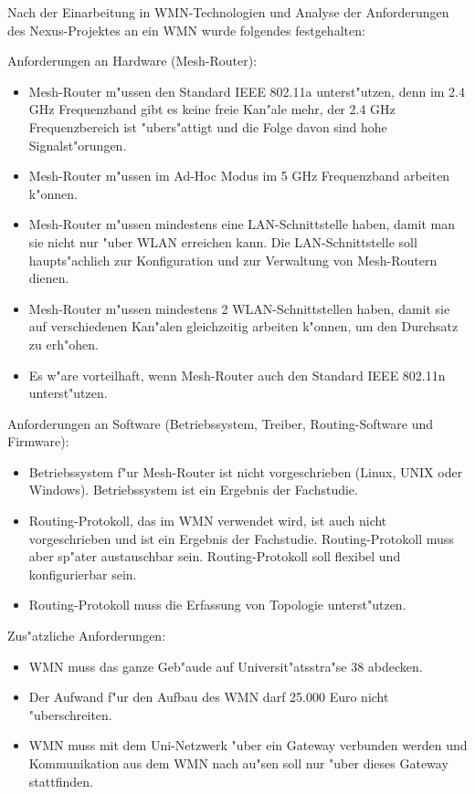 Nach der Einarbeitung in WMN-Technologien und Analyse der Anforderungen
des Nexus-Projektes an ein WMN wurde folgendes festgehalten:

Anforderungen an Hardware (Mesh-Router):

\begin{itemize}
\item Mesh-Router m"ussen den Standard IEEE 802.11a unterst"utzen, denn
im 2.4 GHz Frequenzband gibt es keine freie Kan"ale mehr, der 2.4 GHz
Frequenzbereich ist "ubers"attigt und die Folge davon sind hohe
Signalst"orungen.
\item Mesh-Router m"ussen im Ad-Hoc Modus im 5 GHz Frequenzband arbeiten
k"onnen.
\item Mesh-Router m"ussen mindestens eine LAN-Schnittstelle haben, damit man
sie nicht nur "uber WLAN erreichen kann. Die LAN-Schnittstelle soll
haupts"achlich zur Konfiguration und zur Verwaltung von Mesh-Routern dienen.
\item Mesh-Router m"ussen mindestens 2 WLAN-Schnittstellen haben, damit sie
auf verschiedenen Kan"alen gleichzeitig arbeiten k"onnen, um den Durchsatz
zu erh"ohen.
\item Es w"are vorteilhaft, wenn Mesh-Router auch den Standard IEEE 802.11n
unterst"utzen.
\end{itemize}

Anforderungen an Software (Betriebssystem, Treiber, Routing-Software und
		Firmware):

\begin{itemize}
\item Betriebssystem f"ur Mesh-Router ist nicht vorgeschrieben (Linux, UNIX oder
Windows). Betriebssystem ist ein Ergebnis der Fachstudie.
\item Routing-Protokoll, das im WMN verwendet wird, ist auch nicht
vorgeschrieben und ist ein Ergebnis der Fachstudie. Routing-Protokoll muss
aber sp"ater austauschbar sein. Routing-Protokoll soll flexibel und
konfigurierbar sein.
\item Routing-Protokoll muss die Erfassung von Topologie unterst"utzen.
\end{itemize}

Zus"atzliche Anforderungen:

\begin{itemize}
\item WMN muss das ganze Geb"aude auf Universit"atsstra"se 38 abdecken.
\item Der Aufwand f"ur den Aufbau des WMN darf 25.000 Euro nicht "uberschreiten.
\item WMN muss mit dem Uni-Netzwerk "uber ein Gateway verbunden werden und
Kommunikation aus dem WMN nach au"sen soll nur "uber dieses Gateway
stattfinden.
\end{itemize}
